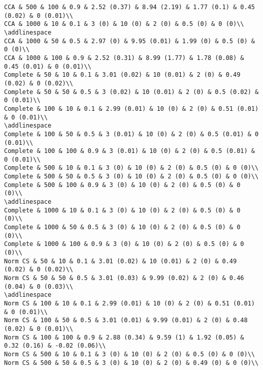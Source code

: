 \documentclass[
]{article}
\begin{document}
\begin{verbatim}
CCA & 500 & 100 & 0.9 & 2.52 (0.37) & 8.94 (2.19) & 1.77 (0.1) & 0.45 (0.02) & 0 (0.01)\\
CCA & 1000 & 10 & 0.1 & 3 (0) & 10 (0) & 2 (0) & 0.5 (0) & 0 (0)\\
\addlinespace
CCA & 1000 & 50 & 0.5 & 2.97 (0) & 9.95 (0.01) & 1.99 (0) & 0.5 (0) & 0 (0)\\
CCA & 1000 & 100 & 0.9 & 2.52 (0.31) & 8.99 (1.77) & 1.78 (0.08) & 0.45 (0.01) & 0 (0.01)\\
Complete & 50 & 10 & 0.1 & 3.01 (0.02) & 10 (0.01) & 2 (0) & 0.49 (0.02) & 0 (0.02)\\
Complete & 50 & 50 & 0.5 & 3 (0.02) & 10 (0.01) & 2 (0) & 0.5 (0.02) & 0 (0.01)\\
Complete & 100 & 10 & 0.1 & 2.99 (0.01) & 10 (0) & 2 (0) & 0.51 (0.01) & 0 (0.01)\\
\addlinespace
Complete & 100 & 50 & 0.5 & 3 (0.01) & 10 (0) & 2 (0) & 0.5 (0.01) & 0 (0.01)\\
Complete & 100 & 100 & 0.9 & 3 (0.01) & 10 (0) & 2 (0) & 0.5 (0.01) & 0 (0.01)\\
Complete & 500 & 10 & 0.1 & 3 (0) & 10 (0) & 2 (0) & 0.5 (0) & 0 (0)\\
Complete & 500 & 50 & 0.5 & 3 (0) & 10 (0) & 2 (0) & 0.5 (0) & 0 (0)\\
Complete & 500 & 100 & 0.9 & 3 (0) & 10 (0) & 2 (0) & 0.5 (0) & 0 (0)\\
\addlinespace
Complete & 1000 & 10 & 0.1 & 3 (0) & 10 (0) & 2 (0) & 0.5 (0) & 0 (0)\\
Complete & 1000 & 50 & 0.5 & 3 (0) & 10 (0) & 2 (0) & 0.5 (0) & 0 (0)\\
Complete & 1000 & 100 & 0.9 & 3 (0) & 10 (0) & 2 (0) & 0.5 (0) & 0 (0)\\
Norm CS & 50 & 10 & 0.1 & 3.01 (0.02) & 10 (0.01) & 2 (0) & 0.49 (0.02) & 0 (0.02)\\
Norm CS & 50 & 50 & 0.5 & 3.01 (0.03) & 9.99 (0.02) & 2 (0) & 0.46 (0.04) & 0 (0.03)\\
\addlinespace
Norm CS & 100 & 10 & 0.1 & 2.99 (0.01) & 10 (0) & 2 (0) & 0.51 (0.01) & 0 (0.01)\\
Norm CS & 100 & 50 & 0.5 & 3.01 (0.01) & 9.99 (0.01) & 2 (0) & 0.48 (0.02) & 0 (0.01)\\
Norm CS & 100 & 100 & 0.9 & 2.88 (0.34) & 9.59 (1) & 1.92 (0.05) & 0.32 (0.16) & -0.02 (0.06)\\
Norm CS & 500 & 10 & 0.1 & 3 (0) & 10 (0) & 2 (0) & 0.5 (0) & 0 (0)\\
Norm CS & 500 & 50 & 0.5 & 3 (0) & 10 (0) & 2 (0) & 0.49 (0) & 0 (0)\\

\end{verbatim}
\end{document}

